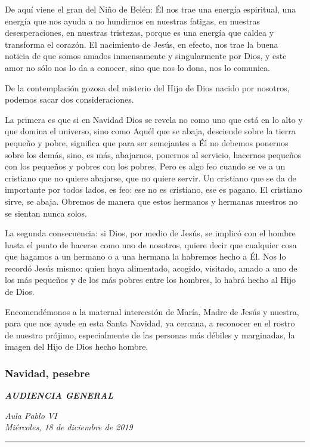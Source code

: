 De aquí viene el gran  del Niño de Belén: Él nos trae una energía espiritual, una energía que nos ayuda a no hundirnos en nuestras fatigas, en nuestras desesperaciones, en nuestras tristezas, porque es una energía que caldea y transforma el corazón. El nacimiento de Jesús, en efecto, nos trae la buena noticia de que somos amados inmensamente y singularmente por Dios, y este amor no sólo nos lo da a conocer, sino que nos lo dona, nos lo comunica.

De la contemplación gozosa del misterio del Hijo de Dios nacido por nosotros, podemos sacar dos consideraciones.

La primera es que si en Navidad Dios se revela no como uno que está en lo alto y que domina el universo, sino como Aquél que se abaja, desciende sobre la tierra pequeño y pobre, significa que para ser semejantes a Él no debemos ponernos sobre los demás, sino, es más, abajarnos, ponernos al servicio, hacernos pequeños con los pequeños y pobres con los pobres. Pero es algo feo cuando se ve a un cristiano que no quiere abajarse, que no quiere servir. Un cristiano que se da de importante por todos lados, es feo: ese no es cristiano, ese es pagano. El cristiano sirve, se abaja. Obremos de manera que estos hermanos y hermanas nuestros no se sientan nunca solos.

La segunda consecuencia: si Dios, por medio de Jesús, se implicó con el hombre hasta el punto de hacerse como uno de nosotros, quiere decir que cualquier cosa que hagamos a un hermano o a una hermana la habremos hecho a Él. Nos lo recordó Jesús mismo: quien haya alimentado, acogido, visitado, amado a uno de los más pequeños y de los más pobres entre los hombres, lo habrá hecho al Hijo de Dios.

Encomendémonos a la maternal intercesión de María, Madre de Jesús y nuestra, para que nos ayude en esta Santa Navidad, ya cercana, a reconocer en el rostro de nuestro prójimo, especialmente de las personas más débiles y marginadas, la imagen del Hijo de Dios hecho hombre.

\subsubsection{Navidad, pesebre} \emph{\textbf{AUDIENCIA GENERAL}}

\emph{Aula Pablo VI\\ Miércoles, 18 de diciembre de 2019}


\begin{center}\rule{0.5\linewidth}{\linethickness}\end{center}

